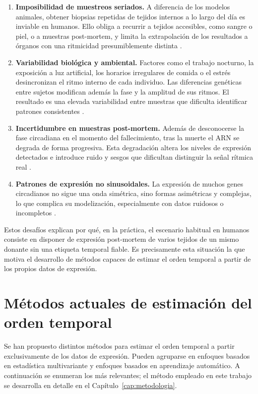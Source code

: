 \documentclass[12pt, a4paper]{report}
\begin{document}
\begin{enumerate}
    \item \textbf{Imposibilidad de muestreos seriados.} A diferencia de los modelos animales, obtener biopsias repetidas de tejidos internos a lo largo del día es inviable en humanos. Ello obliga a recurrir a tejidos accesibles, como sangre o piel, o a muestras post-mortem, y limita la extrapolación de los resultados a órganos con una ritmicidad presumiblemente distinta \cite{brown2005}.
    \item \textbf{Variabilidad biológica y ambiental.} Factores como el trabajo nocturno, la exposición a luz artificial, los horarios irregulares de comida o el estrés desincronizan el ritmo interno de cada individuo. Las diferencias genéticas entre sujetos modifican además la fase y la amplitud de sus ritmos. El resultado es una elevada variabilidad entre muestras que dificulta identificar patrones consistentes \cite{walker2020}.
    \item \textbf{Incertidumbre en muestras post-mortem.} Además de desconocerse la fase circadiana en el momento del fallecimiento, tras la muerte el ARN se degrada de forma progresiva. Esta degradación altera los niveles de expresión detectados e introduce ruido y sesgos que dificultan distinguir la señal rítmica real \cite{zhu2017}.
    \item \textbf{Patrones de expresión no sinusoidales.} La expresión de muchos genes circadianos no sigue una onda simétrica, sino formas asimétricas y complejas, lo que complica su modelización, especialmente con datos ruidosos o incompletos \cite{fmmAlgorithm}.
\end{enumerate}

Estos desafíos explican por qué, en la práctica, el escenario habitual en humanos consiste en disponer de expresión post-mortem de varios tejidos de un mismo donante sin una etiqueta temporal fiable. Es precisamente esta situación la que motiva el desarrollo de métodos capaces de estimar el orden temporal a partir de los propios datos de expresión.

\section{Métodos actuales de estimación del orden temporal}

Se han propuesto distintos métodos para estimar el orden temporal a partir exclusivamente de los datos de expresión. Pueden agruparse en enfoques basados en estadística multivariante y enfoques basados en aprendizaje automático. A continuación se enumeran los más relevantes; el método empleado en este trabajo se desarrolla en detalle en el Capítulo~\ref{cap:metodologia}.
\end{document}
